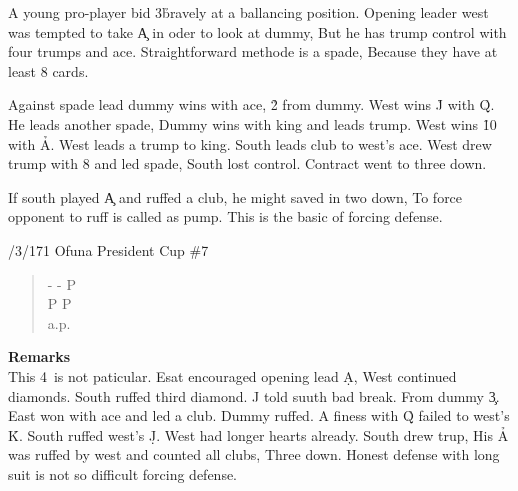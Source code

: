 A young pro-player bid 3\h  bravely  at a ballancing
position. Opening leader west was tempted to take \c A 
in oder to look at dummy, But he has trump control with
four trumps and ace. Straightforward methode is a spade,
Because they have at least 8 cards.

Against spade lead dummy wins with ace, \h 2 from dummy.
West wins \h J with \h Q. He leads another spade, Dummy
wins with king and leads trump. West wins \h 10 with \h A.
West leads a trump to king. South leads club to west's ace.
West drew trump with 8 and led spade, South lost control.
Contract went to three down.

If south played \c A and ruffed a club, he might saved in two
down, To force opponent to ruff is called as  pump. This is
the basic of forcing defense.

\vspace{0.5cm}
/3/171 Ofuna President Cup \#7
\begin{quote}
%
  {}%
  {}
  {}%
  {}%
\end{quote}
\begin{quote}
\begin{bidding}
- \> - \> P  \s \\
P \s \> P \s \\
a.p.
\end{bidding}
\end{quote}
{\bf Remarks}\\
This 4\s\  is not paticular.
Esat encouraged opening lead \d A, West continued diamonds.
South ruffed third diamond. \s J told suuth bad break. From
dummy \c 3. East won with ace and led a club. Dummy ruffed.
A finess with \h Q failed to west's \h K. South ruffed west's \d J.
West had longer hearts  already. South drew trup, His \h A was
ruffed by west and counted all clubs, Three down.
Honest defense with long suit is not so difficult forcing defense.


